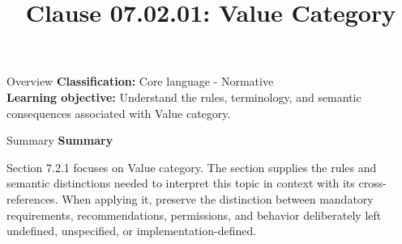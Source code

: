 \documentclass[10pt,letterpaper]{article}
\title{Clause 07.02.01: Value Category}
\author{}
\date{}
\begin{document}
\maketitle
\begin{CornellOverviewBox}{Overview}
\textbf{Classification:} Core language - Normative\\[2pt]
\textbf{Learning objective:} Understand the rules, terminology, and semantic consequences associated with Value category.
\end{CornellOverviewBox}\begin{CornellSummaryBox}{Summary}
{\sffamily\bfseries\color{Accent} Summary}\par\vspace{3pt}Section 7.2.1 focuses on Value category. The section supplies the rules and semantic distinctions needed to interpret this topic in context with its cross-references. When applying it, preserve the distinction between mandatory requirements, recommendations, permissions, and behavior deliberately left undefined, unspecified, or implementation-defined.
\end{CornellSummaryBox}
\end{document}

